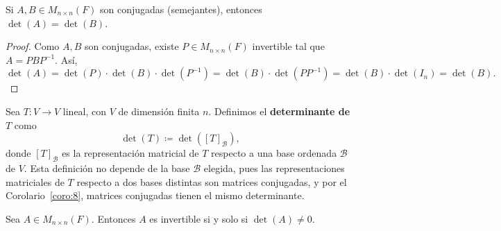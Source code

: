 \documentclass[12pt,a4paper]{book}
\begin{document}
    \begin{corolario}
    \label{coro:8}
        Si $A, B \in M_{n \times n}(F)$ son conjugadas (semejantes), entonces $\det(A) = \det(B)$.
    \end{corolario}

    \begin{proof}
        Como $A, B$ son conjugadas, existe $P \in M_{n \times n}(F)$ invertible tal que $A = PBP^{-1}$. Así,
        \begin{equation*}
            \det(A) = \det(P) \cdot \det(B) \cdot \det(P^{-1}) = \det(B) \cdot \det(PP^{-1}) = \det(B) \cdot \det(I_{n}) = \det(B).
        \end{equation*}
    \end{proof}

    \begin{definicion}
    \label{def:37}
        Sea $T: V \to V$ lineal, con $V$ de dimensión finita $n$. Definimos el \textbf{determinante de $T$} como
        \begin{equation*}
            \det(T) \coloneqq \det([T]_{\mathcal{B}}),
        \end{equation*}
        donde $[T]_{\mathcal{B}}$ es la representación matricial de $T$ respecto a una base ordenada $\mathcal{B}$ de $V$. Esta definición no depende de la base $\mathcal{B}$ elegida, pues las representaciones matriciales de $T$ respecto a dos bases distintas son matrices conjugadas, y por el Corolario~\ref{coro:8}, matrices conjugadas tienen el mismo determinante.
    \end{definicion}

    \begin{teorema}
    \label{teo:14}
        Sea $A \in M_{n \times n}(F)$. Entonces $A$ es invertible si y solo si $\det(A) \neq 0$.
    \end{teorema}
\end{document}
